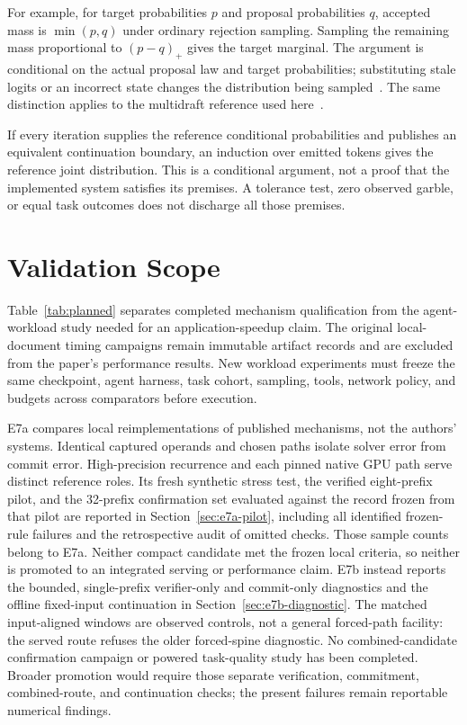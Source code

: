 \documentclass[conference]{IEEEtran}
\begin{document}
For example, for target probabilities $p$ and proposal probabilities $q$, accepted mass is $\min(p,q)$ under ordinary rejection sampling. Sampling the remaining mass proportional to $(p-q)_+$ gives the target marginal. The argument is conditional on the actual proposal law and target probabilities; substituting stale logits or an incorrect state changes the distribution being sampled~\cite{leviathan2023fast,chen2023sampling}. The same distinction applies to the multidraft reference used here~\cite{miao2023specinfer,lumo2026archive}.

If every iteration supplies the reference conditional probabilities and publishes an equivalent continuation boundary, an induction over emitted tokens gives the reference joint distribution. This is a conditional argument, not a proof that the implemented system satisfies its premises. A tolerance test, zero observed garble, or equal task outcomes does not discharge all those premises.


\section{Validation Scope}
\label{app:validation}
Table~\ref{tab:planned} separates completed mechanism qualification from the agent-workload study needed for an application-speedup claim. The original local-document timing campaigns remain immutable artifact records and are excluded from the paper's performance results. New workload experiments must freeze the same checkpoint, agent harness, task cohort, sampling, tools, network policy, and budgets across comparators before execution.



E7a compares local reimplementations of published mechanisms, not the authors' systems. Identical captured operands and chosen paths isolate solver error from commit error. High-precision recurrence and each pinned native GPU path serve distinct reference roles. Its fresh synthetic stress test, the verified eight-prefix pilot, and the 32-prefix confirmation set evaluated against the record frozen from that pilot are reported in Section~\ref{sec:e7a-pilot}, including all identified frozen-rule failures and the retrospective audit of omitted checks. Those sample counts belong to E7a. Neither compact candidate met the frozen local criteria, so neither is promoted to an integrated serving or performance claim. E7b instead reports the bounded, single-prefix verifier-only and commit-only diagnostics and the offline fixed-input continuation in Section~\ref{sec:e7b-diagnostic}. The matched input-aligned windows are observed controls, not a general forced-path facility: the served route refuses the older forced-spine diagnostic. No combined-candidate confirmation campaign or powered task-quality study has been completed. Broader promotion would require those separate verification, commitment, combined-route, and continuation checks; the present failures remain reportable numerical findings.
\end{document}
